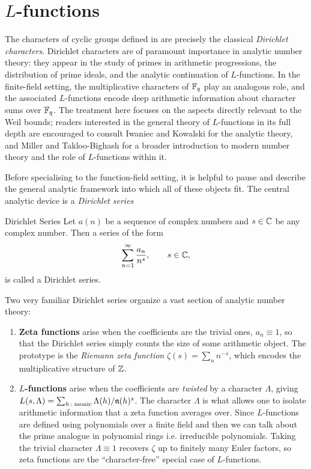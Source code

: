 \section{\texorpdfstring{$L$}{L}-functions}\label{sec:l-functions}
The characters of cyclic groups defined in  are precisely the classical \emph{Dirichlet characters}. Dirichlet characters are of paramount importance in analytic number theory: they appear in the study of primes in arithmetic progressions, the distribution of prime ideals, and the analytic continuation of $L$-functions. In the finite-field setting, the multiplicative characters of $\mathbb{F}_q$ play an analogous role, and the associated $L$-functions encode deep arithmetic information about character sums over $\mathbb{F}_q$. The treatment here focuses on the aspects directly relevant to the Weil bounds; readers interested in the general theory of $L$-functions in its full depth are encouraged to consult Iwaniec and Kowalski \cite{Iwaniec2012} for the analytic theory, and Miller and Takloo-Bighash \cite{Miller2006} for a broader introduction to modern number theory and the role of $L$-functions within it.

Before specialising to the function-field setting, it is helpful to pause and describe the general analytic framework into which all of these objects fit. The central analytic device is a \emph{Dirichlet series}
\begin{Definition}{Dirichlet Series}{}
  Let $a(n)$ be a sequence of complex numbers and $s\in\mathbb{C}$ be any complex number. Then a series of the form $$\sum_{n=1}^{\infty}\frac{a_n}{n^s}, \qquad s\in\mathbb{C},$$ is called a Dirichlet series.
\end{Definition}
 Two very familiar Dirichlet series organize a vast section of analytic number theory:

\begin{enumerate}
  \item\textbf{Zeta functions} arise when the coefficients are the trivial ones, $a_n\equiv 1$, so that the Dirichlet series simply counts the size of some arithmetic object. The prototype is the \emph{Riemann zeta function} $\zeta(s)=\sum_n n^{-s}$, which encodes the multiplicative structure of $\mathbb{Z}$. 

  \item\textbf{$L$-functions} arise when the coefficients are \emph{twisted} by a character $\Lambda$, giving $L(s,\Lambda)=\sum_{h\colon\text{monic}} \Lambda(h)/\mathfrak{n}(h)^s$. The character $\Lambda$ is what allows one to isolate arithmetic information that a zeta function averages over. Since $L$-functions are defined using polynomials over a finite field and then we can talk about the prime analogue in polynomial rings i.e. irreducible polynomials. Taking the trivial character $\Lambda\equiv 1$ recovers $\zeta$ up to finitely many Euler factors, so zeta functions are the ``character-free'' special case of $L$-functions.
\end{enumerate}

